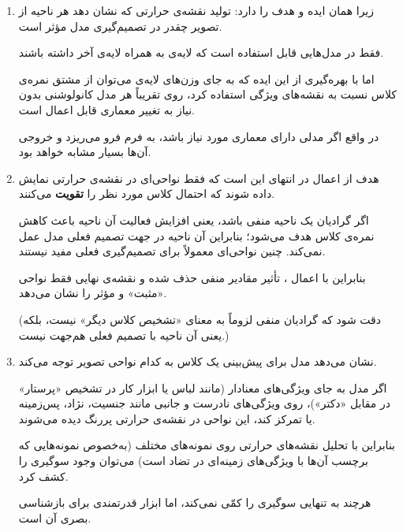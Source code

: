 \begin{enumerate}
	
	\item 
	زیرا  همان ایده و هدف  را دارد: تولید نقشه‌ی حرارتی که نشان دهد هر ناحیه از تصویر چقدر در تصمیم‌گیری مدل مؤثر است. 
	
	 فقط در مدل‌هایی قابل استفاده است که لایه‌ی  به همراه لایه‌ی آخر  داشته باشند. 
	
	اما  با بهره‌گیری از این ایده که به جای وزن‌های لایه‌ی  می‌توان از مشتق نمره‌ی کلاس نسبت به نقشه‌های ویژگی استفاده کرد، روی تقریباً هر مدل کانولوشنی بدون نیاز به تغییر معماری قابل اعمال است. 
	
	در واقع اگر مدلی دارای معماری مورد نیاز  باشد،  به فرم  فرو می‌ریزد و خروجی آن‌ها بسیار مشابه خواهد بود.
	
	\item 
	هدف از اعمال  در انتهای  این است که فقط نواحی‌ای در نقشه‌ی حرارتی نمایش داده شوند که احتمال کلاس مورد نظر را \textbf{تقویت} می‌کنند. 
	
	اگر گرادیان یک ناحیه منفی باشد، یعنی افزایش فعالیت آن ناحیه باعث کاهش نمره‌ی کلاس هدف می‌شود؛ بنابراین آن ناحیه در جهت تصمیم فعلی مدل عمل نمی‌کند. چنین نواحی‌ای معمولاً برای تصمیم‌گیری فعلی مفید نیستند. 
	
	بنابراین با اعمال ، تأثیر مقادیر منفی حذف شده و نقشه‌ی نهایی فقط نواحی «مثبت» و مؤثر را نشان می‌دهد. 
	
	(دقت شود که گرادیان منفی لزوماً به معنای «تشخیص کلاس دیگر» نیست، بلکه یعنی آن ناحیه با تصمیم فعلی هم‌جهت نیست.)
	
	\item 
	 نشان می‌دهد مدل برای پیش‌بینی یک کلاس به کدام نواحی تصویر توجه می‌کند. 
	
	اگر مدل به جای ویژگی‌های معنادار (مانند لباس یا ابزار کار در تشخیص «پرستار» در مقابل «دکتر»)، روی ویژگی‌های نادرست و جانبی مانند جنسیت، نژاد، پس‌زمینه یا  تمرکز کند، این نواحی در نقشه‌ی حرارتی پررنگ دیده می‌شوند. 
	
	بنابراین با تحلیل نقشه‌های حرارتی روی نمونه‌های مختلف (به‌خصوص نمونه‌هایی که برچسب آن‌ها با ویژگی‌های زمینه‌ای در تضاد است) می‌توان وجود سوگیری را کشف کرد. 
	
	هرچند  به تنهایی سوگیری را کمّی نمی‌کند، اما ابزار قدرتمندی برای بازشناسی بصری آن است.
	

\end{enumerate}
